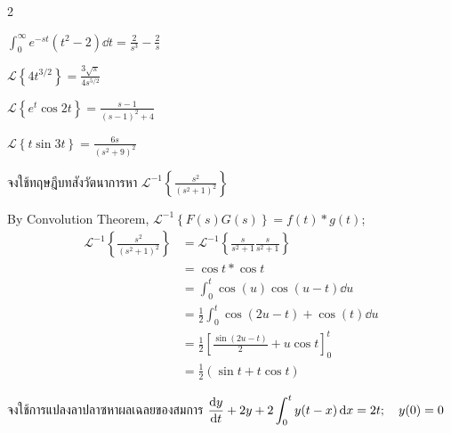 \documentclass[12pt,final]{novelette} %
\begin{document}
\begin{question}[resume]
\begin{multicols}{2}
\begin{question}
            \item
            $\int_0^\infty e^{-st} (t^2 - 2) \dd{t} = \boxed{\frac{2}{s^3} - \frac{2}{s}}$

            \item
            $\mathcal{L}\left\{4t^{3/2}\right\} = \boxed{\frac{3\sqrt\pi}{4s^{5/2}}}$

            \item
            $\mathcal{L}\left\{e^t \cos 2t\right\} = \boxed{\frac{s-1}{(s-1)^2+4}}$

            \item
            $\mathcal{L}\left\{t \sin 3t\right\} = \boxed{\frac{6s}{(s^2+9)^2}}$
        \end{question}
    \end{multicols}

    \item {}
    จงใช้ทฤษฎีบทสังวัตนาการหา $\displaystyle \mathcal{L}^{-1}\left\{\frac{s^2}{(s^2+1)^2}\right\}$ 

    \bigskip
    By Convolution Theorem, $\mathcal{L}^{-1}\left\{F(s)G(s)\right\} = f(t)*g(t)$;
    \begin{align*}
        \mathcal{L}^{-1}\left\{\frac{s^2}{(s^2+1)^2}\right\} & = \mathcal{L}^{-1}\left\{\frac{s}{s^2+1}\frac{s}{s^2+1}\right\} \\
                                                             & = \cos t * \cos t                                               \\
                                                             & = \int_0^t \cos(u) \cos(u-t) \dd{u}                             \\
                                                             & = \frac12 \int_0^t \cos(2u - t) + \cos(t) \dd{u}                \\
                                                             & = \frac12 \left[\frac{\sin(2u - t)}{2} + u\cos t\right]_0^t     \\
                                                             & = \boxed{\frac12 (\sin t + t \cos t)}
    \end{align*}

    \item {}
    จงใช้การแปลงลาปลาซหาผลเฉลยของสมการ $\displaystyle \dv{y}{t} + 2y + 2 \int_0^t y(t-x) \dd{x} = 2t; \quad y(0) = 0$ 


\end{question}
\end{document}
